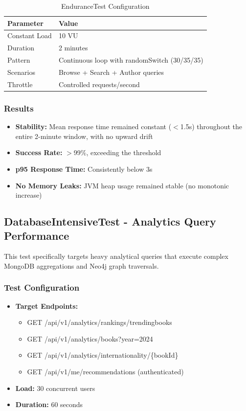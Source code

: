 \begin{table}[H]
    \centering
    \caption{EnduranceTest Configuration}
    \label{tab:endurance_config}
    \begin{tabular}{@{}ll@{}}
        \toprule
        \textbf{Parameter} & \textbf{Value} \\ \midrule
        Constant Load & 10 VU \\
        Duration & 2 minutes \\
        Pattern & Continuous loop with randomSwitch (30/35/35) \\
        Scenarios & Browse + Search + Author queries \\
        Throttle & Controlled requests/second \\
        \bottomrule
    \end{tabular}
\end{table}

\subsubsection{Results}
\begin{itemize}
    \item \textbf{Stability:} Mean response time remained constant ($<$1.5s) throughout the entire 2-minute window, with no upward drift
    \item \textbf{Success Rate:} $>$99\%, exceeding the threshold
    \item \textbf{p95 Response Time:} Consistently below 3s
    \item \textbf{No Memory Leaks:} JVM heap usage remained stable (no monotonic increase)
\end{itemize}

\subsection{DatabaseIntensiveTest - Analytics Query Performance}

This test specifically targets heavy analytical queries that execute complex MongoDB aggregations and Neo4j graph traversals.

\subsubsection{Test Configuration}
\begin{itemize}
    \item \textbf{Target Endpoints:} 
    \begin{itemize}
        \item GET /api/v1/analytics/rankings/trendingbooks
        \item GET /api/v1/analytics/books?year=2024
        \item GET /api/v1/analytics/internationality/\{bookId\}
        \item GET /api/v1/me/recommendations (authenticated)
    \end{itemize}
    \item \textbf{Load:} 30 concurrent users
    \item \textbf{Duration:} 60 seconds
\end{itemize}

